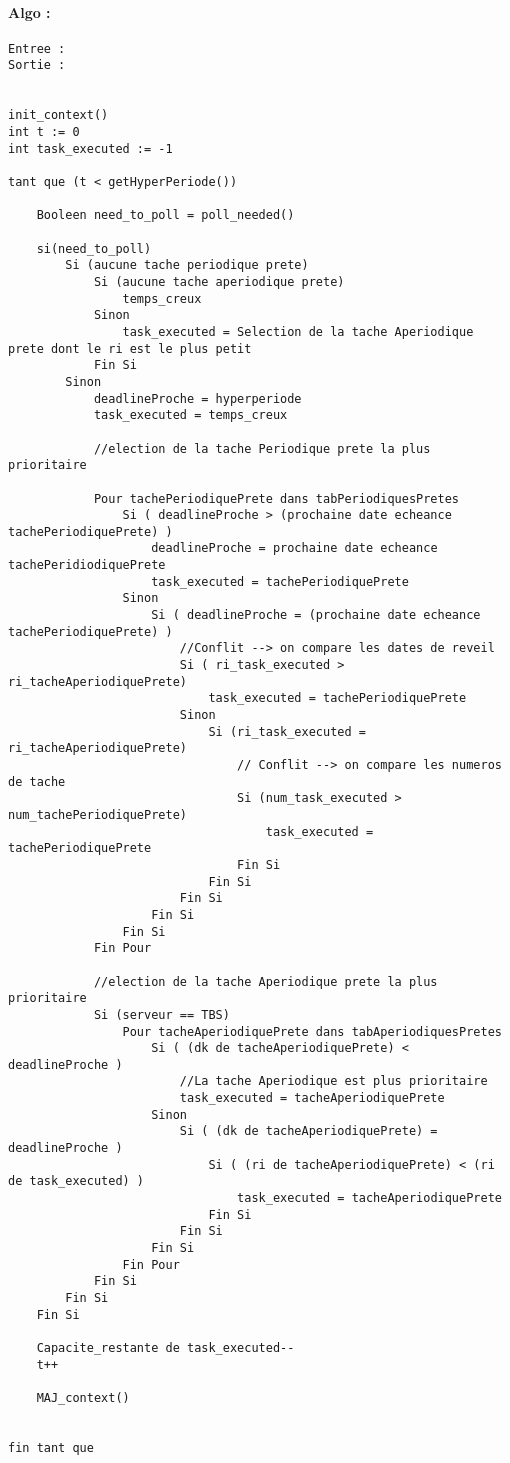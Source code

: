 				\paragraph{Algo :} 
					\begin{verbatim}
Entree : 
Sortie :  


init_context()
int t := 0
int task_executed := -1

tant que (t < getHyperPeriode())
	
	Booleen need_to_poll = poll_needed()
	
	si(need_to_poll)
		Si (aucune tache periodique prete) 
			Si (aucune tache aperiodique prete)
				temps_creux
			Sinon
				task_executed = Selection de la tache Aperiodique prete dont le ri est le plus petit
			Fin Si
		Sinon
			deadlineProche = hyperperiode
			task_executed = temps_creux
			
			//election de la tache Periodique prete la plus prioritaire
			
			Pour tachePeriodiquePrete dans tabPeriodiquesPretes
				Si ( deadlineProche > (prochaine date echeance tachePeriodiquePrete) )
					deadlineProche = prochaine date echeance tachePeridiodiquePrete
					task_executed = tachePeriodiquePrete
				Sinon
					Si ( deadlineProche = (prochaine date echeance tachePeriodiquePrete) )
						//Conflit --> on compare les dates de reveil
						Si ( ri_task_executed > ri_tacheAperiodiquePrete)
							task_executed = tachePeriodiquePrete
						Sinon
							Si (ri_task_executed = ri_tacheAperiodiquePrete)
								// Conflit --> on compare les numeros de tache
								Si (num_task_executed > num_tachePeriodiquePrete)
									task_executed = tachePeriodiquePrete
								Fin Si
							Fin Si
						Fin Si
					Fin Si
				Fin Si
			Fin Pour
			
			//election de la tache Aperiodique prete la plus prioritaire
			Si (serveur == TBS)
				Pour tacheAperiodiquePrete dans tabAperiodiquesPretes
					Si ( (dk de tacheAperiodiquePrete) < deadlineProche )
						//La tache Aperiodique est plus prioritaire
						task_executed = tacheAperiodiquePrete
					Sinon
						Si ( (dk de tacheAperiodiquePrete) = deadlineProche )
							Si ( (ri de tacheAperiodiquePrete) < (ri de task_executed) )
								task_executed = tacheAperiodiquePrete
							Fin Si
						Fin Si
					Fin Si
				Fin Pour
			Fin Si
		Fin Si
	Fin Si
	
	Capacite_restante de task_executed--
	t++
	
	MAJ_context()
	
	
fin tant que
					\end{verbatim}
				
